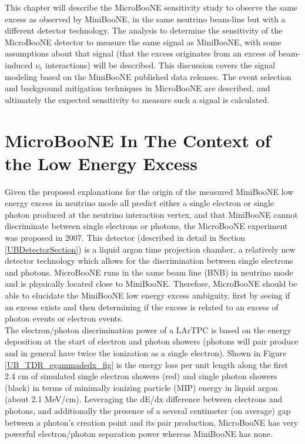 This chapter will describe the MicroBooNE sensitivity study to observe the same excess as observed by MiniBooNE, in the same neutrino beam-line but with a different detector technology.  The analysis to determine the sensitivity of the MicroBooNE detector to measure the same signal as MiniBooNE, with some assumptions about that signal (that the excess originates from an excess of beam-induced $\nu_e$ interactions) will be described. This discussion covers the signal modeling based on the MiniBooNE published data releases. The event selection and background mitigation techniques in MicroBooNE are described, and ultimately the expected sensitivity to measure such a signal is calculated.

\section{MicroBooNE In The Context of the Low Energy Excess}

Given the proposed explanations for the origin of the measured MiniBooNE low energy excess in neutrino mode all predict either a single electron or single photon produced at the neutrino interaction vertex, and that MiniBooNE cannot discriminate between single electrons or photons, the MicroBooNE experiment was proposed in 2007. This detector (described in detail in Section \ref{UBDetectorSection}) is a liquid argon time projection chamber, a relatively new detector technology which allows for the discrimination between single electrons and photons. MicroBooNE runs in the same beam line (BNB) in neutrino mode and is physically located close to MiniBooNE. Therefore, MicroBooNE should be able to elucidate the MiniBooNE low energy excess ambiguity, first by seeing if an excess exists and then determining if the excess is related to an excess of photon events or electron events.\\

The electron/photon discrimination power of a LArTPC is based on the energy deposition at the start of electron and photon showers (photons will pair produce and in general have twice the ionization as a single electron). Shown in Figure \ref{UB_TDR_egammadedx_fig} is the energy loss per unit length along the first 2.4 cm of simulated single electron showers (red) and single photon showers (black) in terms of minimally ionizing particle (MIP) energy in liquid argon (about 2.1 MeV/cm). Leveraging the dE/dx difference between electrons and photons, and additionally the presence of a several centimeter (on average) gap between a photon's creation point and its pair production, MicroBooNE has very powerful electron/photon separation power whereas MiniBooNE has none.\\

